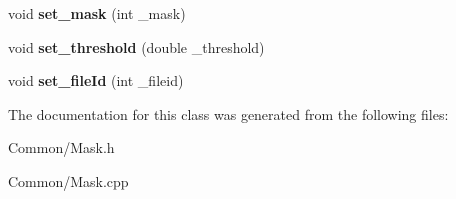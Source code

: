 \begin{DoxyCompactItemize}
\item 
\hypertarget{class_mask_a3d3602e3d1db1b3fd6cb71cac4d9da16}{
void {\bfseries set\_\-mask} (int \_\-mask)}
\label{class_mask_a3d3602e3d1db1b3fd6cb71cac4d9da16}

\item 
\hypertarget{class_mask_a56f44a1372f2fa4d67d26a6072595946}{
void {\bfseries set\_\-threshold} (double \_\-threshold)}
\label{class_mask_a56f44a1372f2fa4d67d26a6072595946}

\item 
\hypertarget{class_mask_a4a05f18062f72853cf20f391cb823943}{
void {\bfseries set\_\-fileId} (int \_\-fileid)}
\label{class_mask_a4a05f18062f72853cf20f391cb823943}

\end{DoxyCompactItemize}


The documentation for this class was generated from the following files:\begin{DoxyCompactItemize}
\item 
Common/Mask.h\item 
Common/Mask.cpp\end{DoxyCompactItemize}
